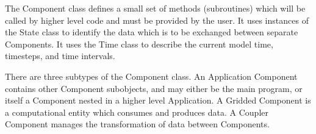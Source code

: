 %


The Component class defines a small set of methods (subroutines) which
will be called by higher level code and must be provided by the user.
It uses instances of the State class to identify the data which is
to be exchanged between separate Components.  It uses the Time class
to describe the current model time, timesteps, and time intervals.


There are three subtypes of the Component class.  An Application
Component contains other Component subobjects, and may either be
the main program, or itself a Component nested in a higher level
Application.  A Gridded Component is a computational entity which
consumes and produces data.  A Coupler Component manages the
transformation of data between Components.



